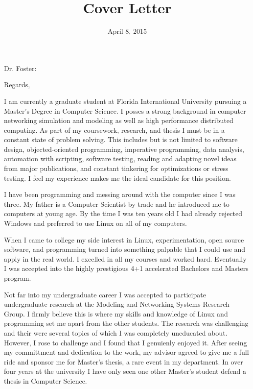 \documentclass[11pt,a4paper,sans]{moderncv}        %
\title{Cover Letter}                               %
\begin{document}
\date{April 8, 2015}
\opening{Dr. Foster:}
\closing{Regards,}
\makelettertitle

I am currently a graduate student at Florida International University pursuing a Master's
Degree in Computer Science. I posses a strong background in computer networking simulation and
modeling as well as high performance distributed computing. As part of my coursework, research,
and thesis I must be in a constant state of problem solving. This includes but is not limited
to software design, objected-oriented programming, imperative programming, data analysis, automation with
scripting, software testing, reading and adapting novel ideas from major publications, and
constant tinkering for optimizations or stress testing. I feel my
experience makes me the ideal candidate for this position.

I have been programming and messing around with the computer since I was three. My father is a
Computer Scientist by trade and he introduced me to computers at young age. By the time I was
ten years old I had already rejected Windows and preferred to use Linux on all of my
computers.

When I came to college my side interest in Linux, experimentation, open source software, and programming
turned into something palpable that I could use and apply in the real world. I excelled in all
my courses and worked hard. Eventually I was accepted into the highly prestigious 4+1 accelerated
Bachelors and Masters program. 

Not far into my undergraduate career I was accepted to participate undergraduate research at
the Modeling and Networking Systems Research Group. I firmly believe this is where my skills 
and knowledge of Linux and programming set me apart from the other students. The research was 
challenging and their were several topics of which I was completely uneducated about. However, 
I rose to challenge and I found that I genuienly enjoyed it. After seeing my committment and 
dedication to the work, my advisor agreed to give me a full ride and sponsor me for Master's 
thesis, a rare event in my department. In over four years at the university I have only seen 
one other Master's student defend a thesis in Computer Science.
\end{document}
